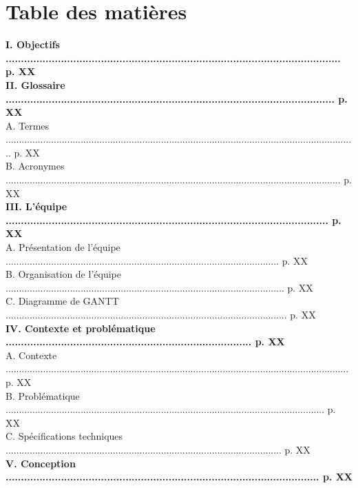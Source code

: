 \documentclass[a4paper,11pt]{book}
\begin{document}
	\maketitle
\section*{Table des matières}
\begin{tabbing}
\textbf{{I. Objectifs ............................................................................................................. p. XX}}\\
\textbf{{II. Glossaire ........................................................................................................... p. XX}}\\
A. Termes ................................................................................................................................... p. XX\\
B. Acronymes ............................................................................................................................. p. XX\\
\textbf{{III. L'équipe ......................................................................................................... p. XX}}\\
A. Présentation de l'équipe ...................................................................................................... p. XX\\
B. Organisation de l'équipe ........................................................................................................ p. XX\\
C. Diagramme de GANTT ......................................................................................................... p. XX\\
\textbf{{IV. Contexte et problématique ................................................................................ p. XX}} \\
A. Contexte ................................................................................................................................ p. XX\\
B. Problématique ....................................................................................................................... p. XX\\
C. Spécifications techniques ....................................................................................................... p. XX\\
\textbf{{V. Conception ...................................................................................................... p. XX}}\\

\end{tabbing}
\end{document}
